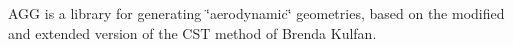 AGG is a library for generating \char`\"{}aerodynamic\char`\"{} geometries, based on the modified and extended version of the CST method of Brenda Kulfan. 